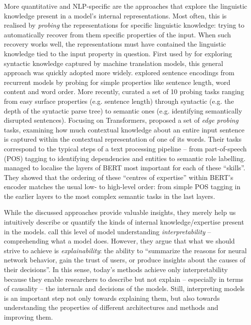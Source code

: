 \documentclass[bsc,frontabs,twoside,singlespacing,parskip,deptreport]{infthesis}
\begin{document}
{{    More quantitative and NLP-specific are the approaches that explore the linguistic knowledge present in a model's internal representations.
    Most often, this is realised by \textit{probing} the representations for specific linguistic knowledge: trying to automatically recover from them specific properties of the input. When such recovery works well, the representations must have contained the linguistic knowledge tied to the input property in question.
    First used by \citet{Shi_2016} for exploring syntactic knowledge captured by machine translation models, this general approach was quickly adopted more widely.
    \citet{Adi_2017} explored sentence encodings from recurrent models by probing for simple properties like sentence length, word content and word order.
    More recently, \citet{Conneau_2018} curated a set of 10 probing tasks ranging from easy surface properties (e.g. sentence length) through syntactic (e.g. the depth of the syntactic parse tree) to semantic ones (e.g. identifying semantically disrupted sentences).
    Focusing on Transformers, \citet{Tenney_2019a} proposed a set of \textit{edge probing} tasks, examining how much contextual knowledge about an entire input sentence is captured within the contextual representation of one of its words.
    Their tasks correspond to the typical steps of a text processing pipeline -- from part-of-speech (POS) tagging to identifying dependencies and entities to semantic role labelling. 
    \citet{Tenney_2019b} managed to localise the layers of BERT most important for each of these ``skills''. They showed that the ordering of these ``centres of expertise'' within BERT's encoder matches the usual low- to high-level order: from simple POS tagging in the earlier layers to the most complex semantic tasks in the last layers.

    While the discussed approaches provide valuable insights, they merely help us intuitively describe or quantify the kinds of internal knowledge/expertise present in the models. 
    \citet{Gilpin_2018} call this level of model understanding \textit{interpretability} -- comprehending what a model does. 
    However, they argue that what we should strive to achieve is \textit{explainability}: the ability to ``summarize the reasons for neural network behavior, gain the trust of users, or produce insights about the causes of their decisions''.
    In this sense, today's methods achieve only interpretability because they enable researchers to describe but not explain -- especially in terms of causality -- the internals and decisions of the models.
    Still, interpreting models is an important step not only towards explaining them, but also towards understanding the properties of different architectures and methods and improving them.
    
}}
\end{document}
